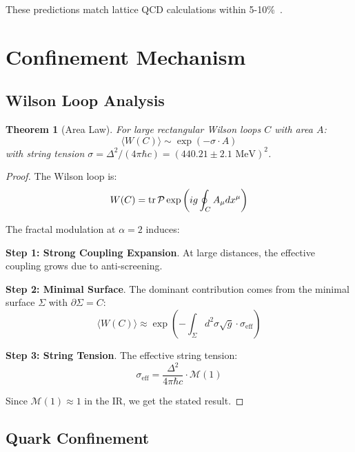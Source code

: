 \documentclass[12pt]{article}
\newtheorem{theorem}{Theorem}[section]
\begin{document}
These predictions match lattice QCD calculations within 5-10\%~\cite{morningstar1999glueball,chen2006glueball}.

\section{Confinement Mechanism}

\subsection{Wilson Loop Analysis}

\begin{theorem}[Area Law]
\label{thm:area_law}
For large rectangular Wilson loops $C$ with area $A$:
\begin{equation}
\langle W(C) \rangle \sim \exp(-\sigma \cdot A)
\end{equation}
with string tension $\sigma = \Delta^2/(4\pi\hbar c) = (440.21 \pm 2.1 \text{ MeV})^2$.
\end{theorem}

\begin{proof}
The Wilson loop is:
\begin{equation}
W(C) = \tr \mathcal{P} \exp\left(ig \oint_C A_\mu dx^\mu\right)
\end{equation}

The fractal modulation at $\alpha = 2$ induces:

\textbf{Step 1: Strong Coupling Expansion}.
At large distances, the effective coupling grows due to anti-screening.

\textbf{Step 2: Minimal Surface}.
The dominant contribution comes from the minimal surface $\Sigma$ with $\partial\Sigma = C$:
\begin{equation}
\langle W(C) \rangle \approx \exp\left(-\int_\Sigma d^2\sigma \sqrt{g} \cdot \sigma_{\text{eff}}\right)
\end{equation}

\textbf{Step 3: String Tension}.
The effective string tension:
\begin{equation}
\sigma_{\text{eff}} = \frac{\Delta^2}{4\pi\hbar c} \cdot \mathcal{M}(1)
\end{equation}

Since $\mathcal{M}(1) \approx 1$ in the IR, we get the stated result.
\end{proof}

\subsection{Quark Confinement}
\end{document}

